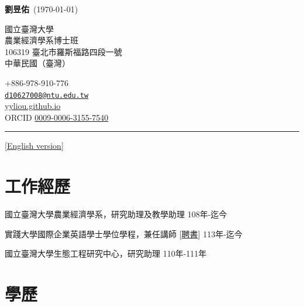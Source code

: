 \documentclass[11pt,letterpaper]{article}
\newlength{\cvindent}
\newlength{\cvcontactwidth}
\newcommand{\cvrule}{\par\noindent\hspace*{-\cvindent}%
  \rule{\dimexpr\textwidth+\cvindent\relax}{0.6pt}\par}
\begin{document}
\noindent\hspace*{-\cvindent}%
\begin{minipage}{\dimexpr\textwidth+\cvindent\relax}
  \raggedright
  {\large\bfseries 劉昱佑}\ {\normalsize (\apstylekinda\today)}

  \vspace{3pt}

  \noindent\hspace*{\cvindent}%
  \begin{minipage}[t]{\dimexpr\linewidth-\cvindent-\cvcontactwidth-1em\relax}\small\raggedright
    國立臺灣大學\\農業經濟學系博士班\\106319
臺北市羅斯福路四段一號\\中華民國（臺灣）
  \end{minipage}\hfill
  \begin{minipage}[t]{\cvcontactwidth}\small\raggedleft
    +886-978-910-776\\\href{mailto:d10627008@ntu.edu.tw}{\nolinkurl{d10627008@ntu.edu.tw}}\\\href{https://yyliou.github.io}{yyliou.github.io}\\ORCID
\href{https://orcid.org/0009-0006-3155-7540}{0009-0006-3155-7540}
  \end{minipage}
\end{minipage}

\vspace{6pt}
\cvrule
\vspace{-6pt}

{\raggedleft\small[\href{https://yyliou.github.io/yyliou/cv/cv_simple.pdf}{English version}]\par}

\section{工作經歷}\label{ux5de5ux4f5cux7d93ux6b77}

國立臺灣大學農業經濟學系，研究助理及教學助理 \hfill \mbox{108年-迄今}

實踐大學國際企業英語學士學位學程，兼任講師
{[}\href{https://yyliou.github.io/yyliou/cv/doc/appointment-letters.pdf}{聘書}{]}
\hfill \mbox{113年-迄今}

國立臺灣大學生態工程研究中心，研究助理 \hfill \mbox{110年-111年}

\section{學歷}\label{ux5b78ux6b77}
\end{document}
